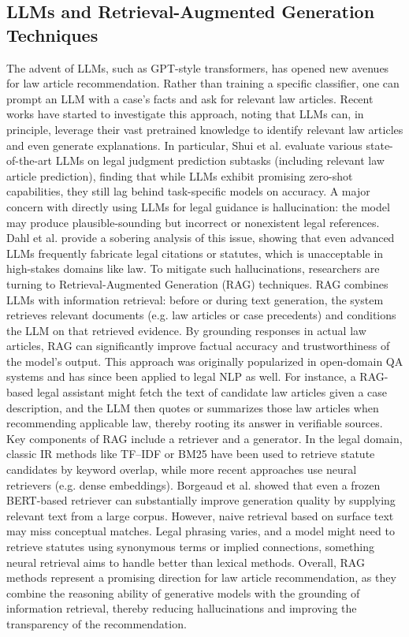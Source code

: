 \documentclass[review,times,nonatbib]{elsarticle} %
\begin{document}
\subsection{LLMs and Retrieval-Augmented Generation Techniques} 
The advent of LLMs, such as GPT-style transformers, has opened new avenues for law article recommendation. Rather than training a specific classifier, one can prompt an LLM with a case’s facts and ask for relevant law articles. Recent works have started to investigate this approach\cite{yang2024large,ma2024leveraging,shui2023comprehensive}, noting that LLMs can, in principle, leverage their vast pretrained knowledge to identify relevant law articles and even generate explanations. In particular, Shui et al.\cite{shui2023comprehensive} evaluate various state-of-the-art LLMs on legal judgment prediction subtasks (including relevant law article prediction), finding that while LLMs exhibit promising zero-shot capabilities, they still lag behind task-specific models on accuracy. A major concern with directly using LLMs for legal guidance is hallucination: the model may produce plausible-sounding but incorrect or nonexistent legal references. Dahl et al.\cite{dahl2024large} provide a sobering analysis of this issue, showing that even advanced LLMs frequently fabricate legal citations or statutes, which is unacceptable in high-stakes domains like law. To mitigate such hallucinations, researchers are turning to Retrieval-Augmented Generation (RAG) techniques. RAG combines LLMs with information retrieval: before or during text generation, the system retrieves relevant documents (e.g. law articles or case precedents) and conditions the LLM on that retrieved evidence. By grounding responses in actual law articles, RAG can significantly improve factual accuracy and trustworthiness of the model’s output. This approach was originally popularized in open-domain QA systems\cite{lewis2020retrieval} and has since been applied to legal NLP as well. For instance, a RAG-based legal assistant might fetch the text of candidate law articles given a case description, and the LLM then quotes or summarizes those law articles when recommending applicable law, thereby rooting its answer in verifiable sources. Key components of RAG include a retriever and a generator. In the legal domain, classic IR methods like TF–IDF\cite{aizawa2003information} or BM25\cite{robertson2009probabilistic} have been used to retrieve statute candidates by keyword overlap, while more recent approaches use neural retrievers (e.g. dense embeddings). Borgeaud et al.\cite{borgeaud2022improving} showed that even a frozen BERT-based retriever can substantially improve generation quality by supplying relevant text from a large corpus. However, naive retrieval based on surface text may miss conceptual matches. Legal phrasing varies, and a model might need to retrieve statutes using synonymous terms or implied connections, something neural retrieval aims to handle better than lexical methods. Overall, RAG methods represent a promising direction for law article recommendation, as they combine the reasoning ability of generative models with the grounding of information retrieval, thereby reducing hallucinations and improving the transparency of the recommendation.
\end{document}
